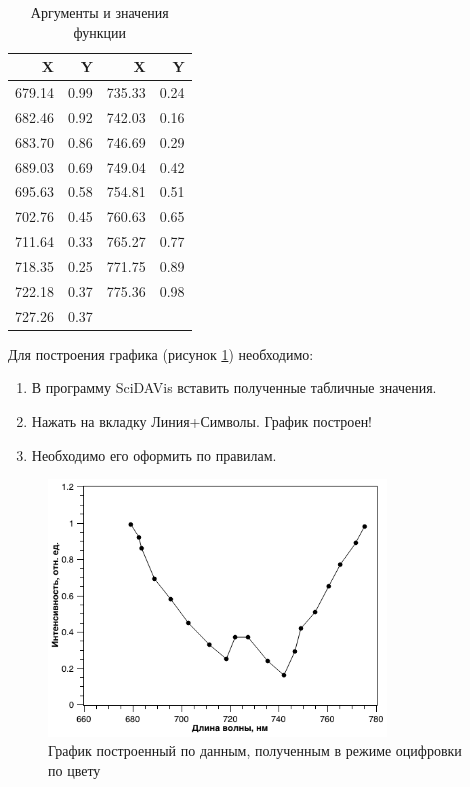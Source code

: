 \documentclass[a4paper,14pt,russian]{report}
\begin{document}
\begin{table}[!htb]
\centering
\caption{Аргументы и значения функции}
\label{table:color}
\begin{tabular}{|r|r|r|r|}
  \hline
  X & Y & X & Y \\
  \hline
  679.14 & 0.99 & 735.33 & 0.24 \\
  682.46 & 0.92 & 742.03 & 0.16 \\
  683.70 & 0.86 & 746.69 & 0.29 \\
  689.03 & 0.69 & 749.04 & 0.42 \\
  695.63 & 0.58 & 754.81 & 0.51 \\
  702.76 & 0.45 & 760.63 & 0.65 \\
  711.64 & 0.33 & 765.27 & 0.77 \\
  718.35 & 0.25 & 771.75 & 0.89 \\
  722.18 & 0.37 & 775.36 & 0.98 \\
  727.26 & 0.37 & & \\
  \hline
\end{tabular}
\end{table}

Для построения графика (рисунок \ref{graph:color}) необходимо:

\begin{enumerate}
  \item В программу SciDAVis вставить полученные табличные значения.
  \item Нажать на вкладку Линия+Символы. График построен!
  \item Необходимо его оформить по правилам.
\end{enumerate}

\begin{figure}[!htb]
  \centerline{\includegraphics[width=0.8\textwidth]{graph-color}}
  \caption{График построенный по данным, полученным в режиме оцифровки по цвету}
  \label{graph:color}
\end{figure}
\end{document}
